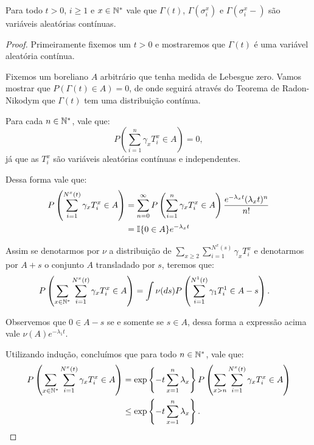 \begin{proposicao}
  \label{prop:gamma-dist-continua}
  Para todo $t > 0$, $i \geq 1$ e $x \in {\mathbb{N^*}}$ vale que $\Gamma(t)$,
  $\Gamma(\sigma^x_i)$ e $\Gamma(\sigma^x_i-)$ são variáveis
  aleatórias contínuas.
\end{proposicao}
\begin{proof}

  Primeiramente fixemos um $t > 0$ e mostraremos que $\Gamma(t)$ é uma
  variável aleatória contínua.

  Fixemos um boreliano $A$ arbitrário que tenha medida de Lebesgue
  zero. Vamos mostrar que $P(\Gamma(t) \in A) = 0$, de onde seguirá
  através do Teorema de Radon-Nikodym que $\Gamma(t)$ tem uma
  distribuição contínua.


  Para cada $n \in {\mathbb{N^*}}$, vale que:
  \begin{displaymath}
    P\left(\sum_{i = 1}^n \gamma_x T_i^x \in A \right) = 0,
  \end{displaymath}
  já que as $T_i^x$ são variáveis aleatórias contínuas e
  independentes.

  Dessa forma vale que:
  \begin{align*}
    P\left(\sum_{i = 1}^{N^x(t)} \gamma_x T_i^x \in A \right) 
    &= \sum_{n = 0}^{\infty}
    P\left(\sum_{i = 1}^n \gamma_x T_i^x \in A \right)
    \frac{e^{-\lambda_x t} (\lambda_x t)^n}{n!}\\
    &= {\mathbb{I}}\{ 0 \in A\} e^{-\lambda_x t} 
  \end{align*}

  Assim se denotarmos por $\nu$ a distribuição de $\sum_{x \geq 2}
  \sum_{i = 1}^{N^x(s)} \gamma_x T_i^x$ e denotarmos por $A+s$ o
  conjunto $A$ transladado por $s$, teremos que:
  \begin{align*}
    P\left(\sum_{x \in {\mathbb{N^*}}}\sum_{i = 1}^{N^x(t)} \gamma_x T_i^x \in A  \right) 
    &= \int \nu(d s) P\left(\sum_{i = 1}^{N^1(t)} \gamma_1 T_i^1 \in A - s\right).
  \end{align*}

  Observemos que $0 \in A - s$ se e somente se $s \in A$, dessa forma
  a expressão acima vale $\nu(A) e^{-\lambda_1 t}$.

  Utilizando indução, concluímos que para todo $n \in {\mathbb{N^*}}$, vale que:
  \begin{align*}
    P\left(\sum_{x \in {\mathbb{N^*}}}\sum_{i = 1}^{N^x(t)} \gamma_x T_i^x \in A \right) 
    &= \exp\left\{ -t \sum_{x = 1}^n \lambda_x \right\}
    P\left(\sum_{x > n} \sum_{i = 1}^{N^x(t)} \gamma_x T_i^x \in A \right) \\
    &\leq \exp\left\{ -t \sum_{x = 1}^n \lambda_x \right\}.
  \end{align*}


\end{proof}
